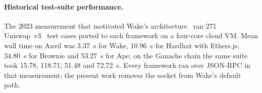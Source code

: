 \documentclass[11pt,a4paper]{article}
\newcommand{\wake}{Wake}
\begin{document}
\paragraph{Historical test-suite performance.} The 2023 measurement that motivated \wake{}'s architecture~\cite{gattermayer2023wake,pythonframeworksbenchmark} ran 271 Uniswap~v3~\cite{adams2021uniswapv3} test cases ported to each framework on a four-core cloud VM. Mean wall time on Anvil was 3.37~s for \wake{}, 10.96~s for Hardhat with Ethers.js, 34.80~s for Brownie and 53.27~s for Ape; on the Ganache chain the same suite took 15.78, 118.71, 51.48 and 72.72~s. Every framework ran over JSON-RPC in that measurement; the present work removes the socket from \wake{}'s default path.
\end{document}
